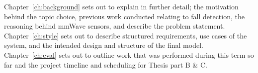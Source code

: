 Chapter~\ref{ch:background} sets out to explain in further detail; the motivation behind the topic choice, previous work conducted relating to fall detection, the reasoning behind mmWave sensors, and describe the problem statement. 
Chapter~\ref{ch:style} sets out to describe structured requirements, use cases of the system, and the intended design and structure of the final model.
Chapter~\ref{ch:eval} sets out to outline work that was performed during this term so far and the project timeline and scheduling for Thesis part B \& C. 

